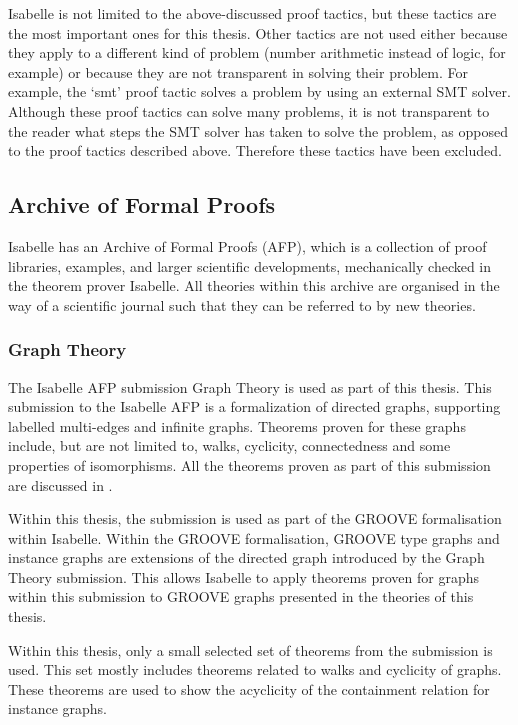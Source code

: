 Isabelle is not limited to the above-discussed proof tactics, but these tactics are the most important ones for this thesis. Other tactics are not used either because they apply to a different kind of problem (number arithmetic instead of logic, for example) or because they are not transparent in solving their problem. For example, the `smt' proof tactic solves a problem by using an external SMT solver. Although these proof tactics can solve many problems, it is not transparent to the reader what steps the SMT solver has taken to solve the problem, as opposed to the proof tactics described above. Therefore these tactics have been excluded.

\subsection{Archive of Formal Proofs}
Isabelle has an Archive of Formal Proofs (AFP), which is a collection of proof libraries, examples, and larger scientific developments, mechanically checked in the theorem prover Isabelle. All theories within this archive are organised in the way of a scientific journal such that they can be referred to by new theories.

\subsubsection{Graph Theory}
The Isabelle AFP submission Graph Theory \cite{noschinski-graph_theory} is used as part of this thesis. This submission to the Isabelle AFP is a formalization of directed graphs, supporting labelled multi-edges and infinite graphs. Theorems proven for these graphs include, but are not limited to, walks, cyclicity, connectedness and some properties of isomorphisms. All the theorems proven as part of this submission are discussed in \cite{bang-jensen_gutin_2010}.

Within this thesis, the submission is used as part of the GROOVE formalisation within Isabelle. Within the GROOVE formalisation, GROOVE type graphs and instance graphs are extensions of the directed graph introduced by the Graph Theory submission. This allows Isabelle to apply theorems proven for graphs within this submission to GROOVE graphs presented in the theories of this thesis.

Within this thesis, only a small selected set of theorems from the submission is used. This set mostly includes theorems related to walks and cyclicity of graphs. These theorems are used to show the acyclicity of the containment relation for instance graphs.
